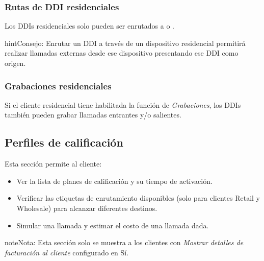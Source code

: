\documentclass[letterpaper,10pt,spanish]{sphinxmanual}
\begin{document}
\subsubsection{Rutas de DDI residenciales}
\label{administration_portal/client/residential/ddis:residential-ddi-routes}
Los DDIs residenciales solo pueden ser enrutados a {\hyperref[administration_portal/client/residential/residential_devices:residential\string-devices]{}} o {\hyperref[administration_portal/client/vpbx/faxes:faxing\string-system]{}}.

\begin{notice}{hint}{Consejo:}
Enrutar un DDI a través de un dispositivo residencial permitirá realizar llamadas externas desde ese dispositivo presentando ese DDI como origen.
\end{notice}


\subsubsection{Grabaciones residenciales}
\label{administration_portal/client/residential/ddis:residential-recordings}
Si el cliente residencial tiene habilitada la función de \emph{Grabaciones}, los DDIs también pueden grabar llamadas entrantes y/o salientes.


\subsection{Perfiles de calificación}
\label{administration_portal/client/residential/rating_profiles:rating-profiles}\label{administration_portal/client/residential/rating_profiles::doc}
Esta sección permite al cliente:
\begin{itemize}
\item {} 
Ver la lista de planes de calificación y su tiempo de activación.

\item {} 
Verificar las etiquetas de enrutamiento disponibles (solo para clientes Retail y Wholesale) para alcanzar diferentes destinos.

\item {} 
Simular una llamada y estimar el costo de una llamada dada.

\end{itemize}

\begin{notice}{note}{Nota:}
Esta sección solo se muestra a los clientes con \emph{Mostrar detalles de facturación al cliente} configurado en Sí.
\end{notice}
\end{document}
